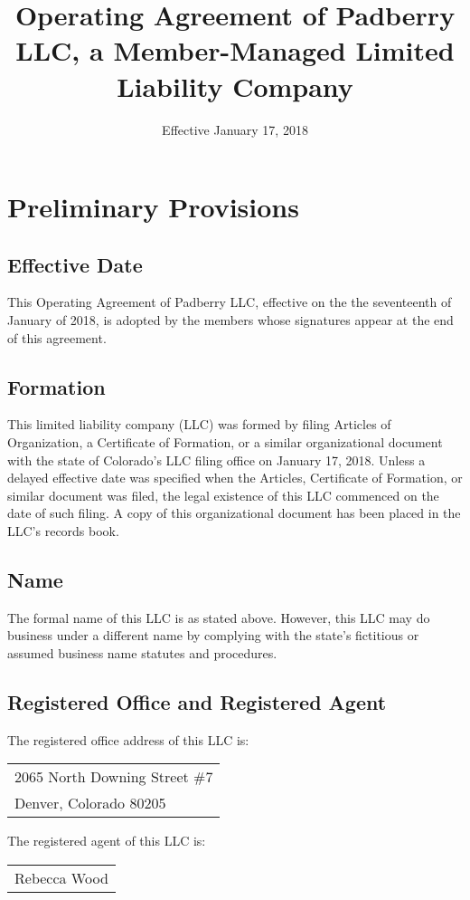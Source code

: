 \documentclass{article}
\begin{document}
\title{Operating Agreement of Padberry LLC, a Member-Managed Limited Liability Company}
\date{Effective January 17, 2018}
\maketitle

	\section{Preliminary Provisions}

			\subsection{Effective Date}
			This Operating Agreement of Padberry LLC, effective on the the seventeenth of January of 2018, is adopted by the members whose signatures appear at the end of this agreement.

			\subsection{Formation}
			This limited liability company (LLC) was formed by filing Articles of Organization, a Certificate of Formation, or a similar organizational document with the state of Colorado's LLC filing office on January 17, 2018. Unless a delayed effective date was specified when the Articles, Certificate of Formation, or similar document was filed, the legal existence of this LLC commenced on the date of such filing. A copy of this organizational document has been placed in the LLC's records book.

			\subsection{Name}
			The formal name of this LLC is as stated above. However, this LLC may do business under a different name by complying with the state's fictitious or assumed business name statutes and procedures.

			\subsection{Registered Office and Registered Agent}
			The registered office address of this LLC is:

			\begin{center}
				\begin{tabular}{l}
					2065 North Downing Street \#7\\
					Denver, Colorado 80205\\
				\end{tabular}
			\end{center}
			\noindent The registered agent of this LLC is:
			\begin{center}
				\begin{tabular}{l}
					Rebecca Wood\\
				\end{tabular}
			\end{center}
\end{document}
